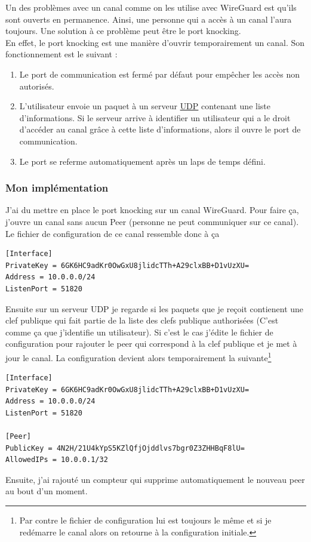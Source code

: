 \documentclass[a4paper, 12pt]{article}
\begin{document}
Un des problèmes avec un canal comme on les utilise avec WireGuard est qu'ils sont ouverts en permanence. Ainsi, une personne qui a accès à un canal l'aura toujours. Une solution à ce problème peut être le port knocking. \\
En effet, le port knocking est une manière d'ouvrir temporairement un canal. Son fonctionnement est le suivant :

\begin{enumerate}
\item Le port de communication est fermé par défaut pour empêcher les accès non autorisés.
\item L'utilisateur envoie un paquet à un serveur \hyperref[UDP]{UDP} contenant une liste d'informations. Si le serveur arrive à identifier un utilisateur qui a le droit d'accéder au canal grâce à cette liste d'informations, alors il ouvre le port de communication.
\item Le port se referme automatiquement après un laps de temps défini.
\end{enumerate}
\subsubsection{Mon implémentation}
J'ai du mettre en place le port knocking sur un canal WireGuard. Pour faire ça, j'ouvre un canal sans aucun Peer (personne ne peut communiquer sur ce canal). Le fichier de configuration de ce canal ressemble donc à ça 
\begin{lstlisting}[language = shell]
[Interface]
PrivateKey = 6GK6HC9adKr0OwGxU8jlidcTTh+A29clxBB+D1vUzXU= 
Address = 10.0.0.0/24
ListenPort = 51820
\end{lstlisting}
Ensuite sur un serveur UDP je regarde si les paquets que je reçoit contienent une clef publique qui fait partie de la liste des clefs publique authorisées (C'est comme ça que j'identifie un utilisateur). Si c'est le cas j'édite le fichier de configuration pour rajouter le peer qui correspond à la clef publique et je met à jour le canal. La configuration devient alors temporairement la suivante\footnote{Par contre le fichier de configuration lui est toujours le même et si je redémarre le canal alors on retourne à la configuration initiale.}
\begin{lstlisting}[language = shell]
[Interface]
PrivateKey = 6GK6HC9adKr0OwGxU8jlidcTTh+A29clxBB+D1vUzXU= 
Address = 10.0.0.0/24
ListenPort = 51820

[Peer]
PublicKey = 4N2H/21U4kYpS5KZlQfjOjddlvs7bgr0Z3ZHHBqF8lU=
AllowedIPs = 10.0.0.1/32
\end{lstlisting}
Ensuite, j'ai rajouté un compteur qui supprime automatiquement le nouveau peer au bout d'un moment. \\
\end{document}
